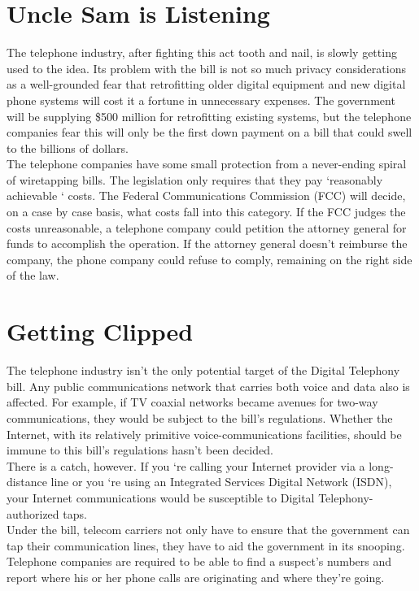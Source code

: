 \section{Uncle Sam is Listening}
The telephone industry, after fighting this act tooth and nail, is
slowly getting used to the idea. Its problem with the bill is not so
much privacy considerations as a well-grounded fear that retrofitting
older digital equipment and new digital phone systems will cost it a
fortune in unnecessary expenses. The government will be supplying \$500
million for retrofitting existing systems, but the telephone companies
fear this will only be the first down payment on a bill that could
swell to the billions of dollars.\\

The telephone companies have some small protection from a never-ending
spiral of wiretapping bills. The legislation only requires that they
pay `reasonably achievable ` costs. The Federal Communications
Commission (FCC) will decide, on a case by case basis, what costs fall
into this category. If the FCC judges the costs unreasonable, a
telephone company could petition the attorney general for funds to
accomplish the operation. If the attorney general doesn't reimburse the
company, the phone company could refuse to comply, remaining on the
right side of the law.

\section{Getting Clipped}
The telephone industry isn't the only potential target of the Digital
Telephony bill. Any public communications network that carries both
voice and data also is affected. For example, if TV coaxial networks
became avenues for two-way communications, they would be subject to the
bill's regulations. Whether the Internet, with its relatively primitive
voice-communications facilities, should be immune to this bill's
regulations hasn't been decided.\\

There is a catch, however. If you `re calling your Internet provider
via a long-distance line or you `re using an Integrated Services
Digital Network (ISDN), your Internet communications would be
susceptible to Digital Telephony-authorized taps.\\

Under the bill, telecom carriers not only have to ensure that the
government can tap their communication lines, they have to aid the
government in its snooping. Telephone companies are required to be able
to find a suspect's numbers and report where his or her phone calls are
originating and where they're going.\\

